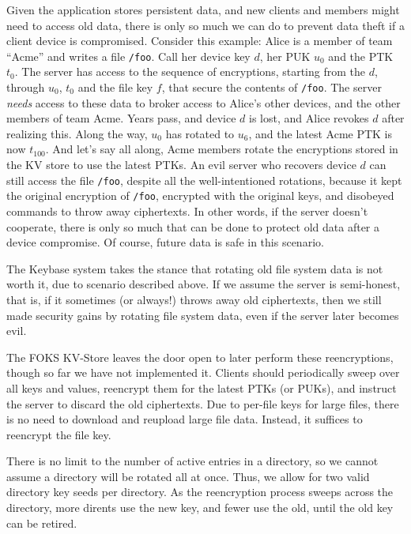 Given the application stores persistent data, and new clients and members might need to
access old data, there is only so much we can do to prevent data theft if a
client device is compromised.  Consider this example: Alice is a member of team
``Acme'' and writes a file \texttt{/foo}.  Call her device key $d$, her PUK
$u_0$ and the PTK $t_0$. The server has access to the sequence of encryptions,
starting from the $d$, through $u_0$, $t_0$ and the file key $f$, that secure the contents of
\texttt{/foo}. The server \textit{needs} access to these data to broker access
to Alice's other devices, and the other members of team Acme.
Years pass, and device $d$ is lost, and Alice revokes $d$ after
realizing this.  Along the way, $u_0$ has rotated to $u_6$, and the latest Acme
PTK is now $t_{100}$.  And let's say all along, Acme members
rotate the encryptions stored in the KV store to use the latest PTKs. An evil
server who recovers device $d$ can still access the file \texttt{/foo}, despite
all the well-intentioned rotations, because it kept the original encryption of
\texttt{/foo}, encrypted with the original keys, and disobeyed commands to throw
away ciphertexts. In other words, if the server doesn't cooperate, there is
only so much that can be done to protect old data after a device compromise.  Of
course, future data is safe in this scenario.

The Keybase system takes the stance that rotating old file system
data is not worth it, due to scenario described above. If we 
assume the server is semi-honest, that is, if it sometimes (or always!)
throws away old ciphertexts, then we still made
security gains by rotating file system data, even if the server later
becomes evil.

The FOKS KV-Store leaves the door open to later perform these
reencryptions, though so far we have not implemented it.
Clients should periodically sweep over all keys and values,
reencrypt them for the latest PTKs (or PUKs), and instruct
the server to discard the old ciphertexts. Due to per-file
keys for large files, there is no need to download and reupload
large file data. Instead, it suffices to reencrypt the file key.

There is no limit to the number of active entries in a directory,
so we cannot assume a directory will be rotated all at once. Thus, 
we allow for two valid directory key seeds per directory. As the
reencryption process sweeps across the directory, more dirents
use the new key, and fewer use the old, until the old key can 
be retired.

